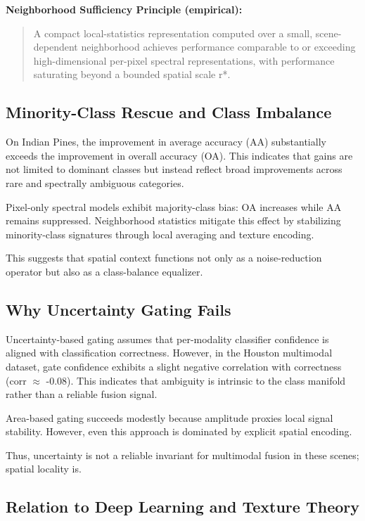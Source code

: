 \documentclass[
  journal]{IEEEtran}
\begin{document}
\textbf{Neighborhood Sufficiency Principle (empirical):}

\begin{quote}
A compact local-statistics representation computed over a small,
scene-dependent neighborhood achieves performance comparable to or
exceeding high-dimensional per-pixel spectral representations, with
performance saturating beyond a bounded spatial scale r*.
\end{quote}

\subsection{Minority-Class Rescue and Class
Imbalance}\label{minority-class-rescue-and-class-imbalance}

On Indian Pines, the improvement in average accuracy (AA) substantially
exceeds the improvement in overall accuracy (OA). This indicates that
gains are not limited to dominant classes but instead reflect broad
improvements across rare and spectrally ambiguous categories.

Pixel-only spectral models exhibit majority-class bias: OA increases
while AA remains suppressed. Neighborhood statistics mitigate this
effect by stabilizing minority-class signatures through local averaging
and texture encoding.

This suggests that spatial context functions not only as a
noise-reduction operator but also as a class-balance equalizer.

\subsection{Why Uncertainty Gating
Fails}\label{why-uncertainty-gating-fails}

Uncertainty-based gating assumes that per-modality classifier confidence
is aligned with classification correctness. However, in the Houston
multimodal dataset, gate confidence exhibits a slight negative
correlation with correctness (corr \(\approx\) -0.08). This indicates that
ambiguity is intrinsic to the class manifold rather than a reliable
fusion signal.

Area-based gating succeeds modestly because amplitude proxies local
signal stability. However, even this approach is dominated by explicit
spatial encoding.

Thus, uncertainty is not a reliable invariant for multimodal fusion in
these scenes; spatial locality is.

\subsection{Relation to Deep Learning and Texture
Theory}\label{relation-to-deep-learning-and-texture-theory}
\end{document}
